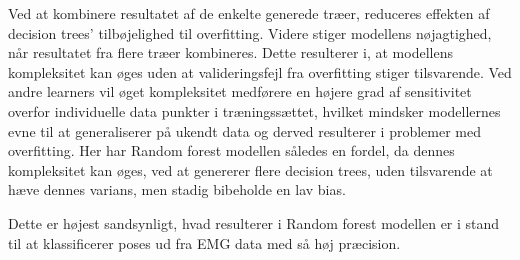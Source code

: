 Ved at kombinere resultatet af de enkelte generede træer, reduceres effekten af decision trees' tilbøjelighed til overfitting. Videre stiger modellens nøjagtighed, når resultatet fra flere træer kombineres. Dette resulterer i, at modellens kompleksitet kan øges uden at valideringsfejl fra overfitting stiger tilsvarende. 
Ved andre learners vil øget kompleksitet medførere en højere grad af sensitivitet overfor individuelle data punkter i træningssættet, hvilket mindsker modellernes evne til at generaliserer på ukendt data og derved resulterer i problemer med overfitting. Her har Random forest modellen således en fordel, da dennes kompleksitet kan øges, ved at genererer flere decision trees, uden tilsvarende at hæve dennes varians, men stadig bibeholde en lav bias. 

Dette er højest sandsynligt, hvad resulterer i Random forest modellen er i stand til at klassificerer poses ud fra EMG data med så høj præcision.   

